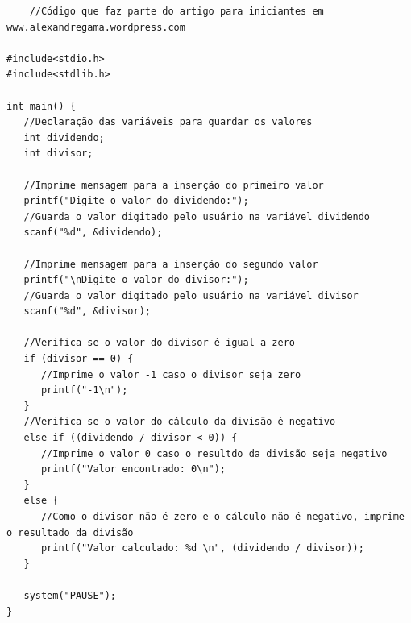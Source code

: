 \documentclass[a4paper, 12pt, oneside]{article}
\begin{document}
\begin{lstlisting}
    //Código que faz parte do artigo para iniciantes em www.alexandregama.wordpress.com

#include<stdio.h>
#include<stdlib.h>

int main() {
   //Declaração das variáveis para guardar os valores
   int dividendo;
   int divisor;
   
   //Imprime mensagem para a inserção do primeiro valor
   printf("Digite o valor do dividendo:");
   //Guarda o valor digitado pelo usuário na variável dividendo
   scanf("%d", &dividendo);
   
   //Imprime mensagem para a inserção do segundo valor
   printf("\nDigite o valor do divisor:");
   //Guarda o valor digitado pelo usuário na variável divisor
   scanf("%d", &divisor);   
   
   //Verifica se o valor do divisor é igual a zero
   if (divisor == 0) {
      //Imprime o valor -1 caso o divisor seja zero
      printf("-1\n");
   }
   //Verifica se o valor do cálculo da divisão é negativo
   else if ((dividendo / divisor < 0)) {
      //Imprime o valor 0 caso o resultdo da divisão seja negativo
      printf("Valor encontrado: 0\n");
   }
   else {
      //Como o divisor não é zero e o cálculo não é negativo, imprime o resultado da divisão
      printf("Valor calculado: %d \n", (dividendo / divisor));
   }
   
   system("PAUSE");
}
\end{lstlisting}

\nocite{livro}



\end{document}
